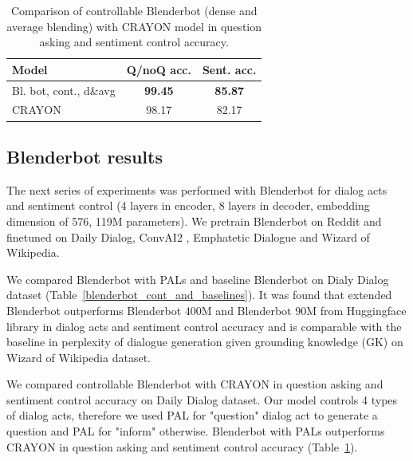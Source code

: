\documentclass[11pt]{article}
\begin{document}
\begin{table}[ht]
\fontsize{9}{11}
\selectfont 
\centering
\begin{tabular}{lcc}
\hline
Model                          & Q/noQ acc.  & Sent. acc. \\ \hline
Bl. bot, cont., d\&avg & \textbf{99.45} & \textbf{85.87} \\
CRAYON                         & 98.17 & 82.17 \\
\hline
\end{tabular}
\caption{Comparison of controllable Blenderbot (dense and average blending) with CRAYON model in question asking and sentiment control accuracy.}
\label{blenderbot_cont_and_crayon}
\end{table}

\subsection{Blenderbot results}

The next series of experiments was performed with Blenderbot for dialog acts and sentiment control (4 layers in encoder, 8 layers in decoder, embedding dimension of 576, 119M parameters). %
We pretrain Blenderbot on Reddit and finetuned on Daily Dialog, ConvAI2 \cite{dinan2020second}, Emphatetic Dialogue and Wizard of Wikipedia.

We compared Blenderbot with PALs and baseline Blenderbot on Dialy Dialog dataset (Table~\ref{blenderbot_cont_and_baselines}). It was found that extended Blenderbot outperforms Blenderbot 400M and Blenderbot 90M from Huggingface library in dialog acts and sentiment control accuracy and is comparable with the baseline in perplexity of dialogue generation given grounding knowledge (GK) on Wizard of Wikipedia dataset.

We compared controllable Blenderbot with CRAYON \cite{hu2021controllable} in question asking and sentiment control accuracy on Daily Dialog dataset. Our model controls 4 types of dialog acts, therefore we used PAL for "question"{} dialog act to generate a question and PAL for "inform" otherwise. Blenderbot with PALs outperforms CRAYON in question asking and sentiment control accuracy (Table~\ref{blenderbot_cont_and_crayon}).
\end{document}
